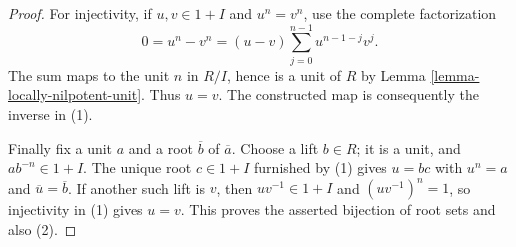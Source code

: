 \begin{proof}
\medskip\noindent
For injectivity, if $u,v\in1+I$ and $u^n=v^n$, use the complete
factorization
$$
0=u^n-v^n=(u-v)\sum_{j=0}^{n-1}u^{n-1-j}v^j.
$$
The sum maps to the unit $n$ in $R/I$, hence is a unit of $R$ by
Lemma \ref{lemma-locally-nilpotent-unit}. Thus $u=v$.
The constructed map is consequently the inverse in (1).

\medskip\noindent
Finally fix a unit $a$ and a root $\overline b$ of $\overline a$.
Choose a lift $b\in R$; it is a unit, and $ab^{-n}\in1+I$.
The unique root $c\in1+I$ furnished by (1) gives $u=bc$ with
$u^n=a$ and $\overline u=\overline b$.
If another such lift is $v$, then $uv^{-1}\in1+I$ and
$(uv^{-1})^n=1$, so injectivity in (1) gives $u=v$.
This proves the asserted bijection of root sets and also (2).
\end{proof}